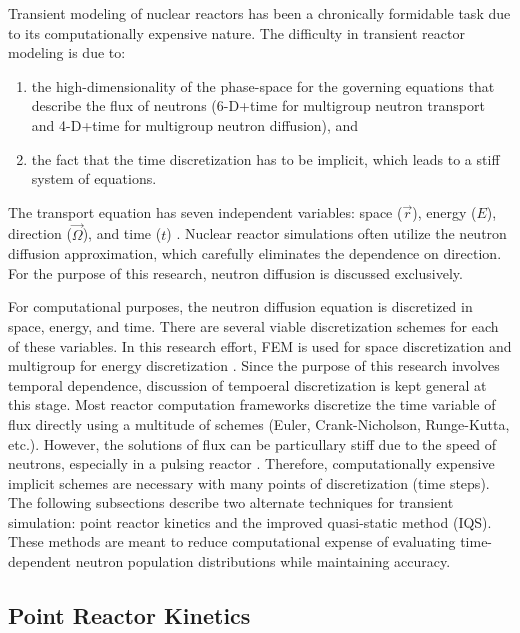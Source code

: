 Transient modeling of nuclear reactors has been a chronically formidable task due to its computationally expensive nature. The difficulty in transient reactor modeling is due to:
\begin{enumerate}
\item
the high-dimensionality of the phase-space for the governing equations that describe the flux of neutrons (6-D+time for multigroup neutron transport and 4-D+time for multigroup neutron diffusion), and 
\item
the fact that the time discretization has to be implicit, which  leads to a stiff system of equations.  
\end{enumerate}
The transport equation has seven independent variables: space ($\vec{r}$), energy ($E$), direction ($\vec{\Omega}$), and time ($t$) \cite{duderstadt1976nuclear}.  Nuclear reactor simulations often utilize the neutron diffusion approximation, which carefully eliminates the dependence on direction.  For the purpose of this research, neutron diffusion is discussed exclusively.

For computational purposes, the neutron diffusion equation is discretized in space, energy, and time.  There are several viable discretization schemes for each of these variables. In this research effort, FEM is used for space discretization and multigroup for energy discretization \cite{zeinkiewicz2005finite, duderstadt1976nuclear}. Since the purpose of this research involves temporal dependence, discussion of tempoeral discretization is kept general at this stage. Most reactor computation frameworks discretize the time variable of flux directly using a multitude of schemes (Euler, Crank-Nicholson, Runge-Kutta, etc.).  However, the solutions of flux can be particullary stiff due to the speed of neutrons, especially in a pulsing reactor \cite{TWIGL_benchmark}. Therefore, computationally expensive implicit schemes are necessary with many points of discretization (time steps). The following subsections describe two alternate techniques for transient simulation: point reactor kinetics and the improved quasi-static method (IQS). These methods are meant to reduce computational expense of evaluating time-dependent neutron population distributions while maintaining accuracy.

\subsection{Point Reactor Kinetics}

